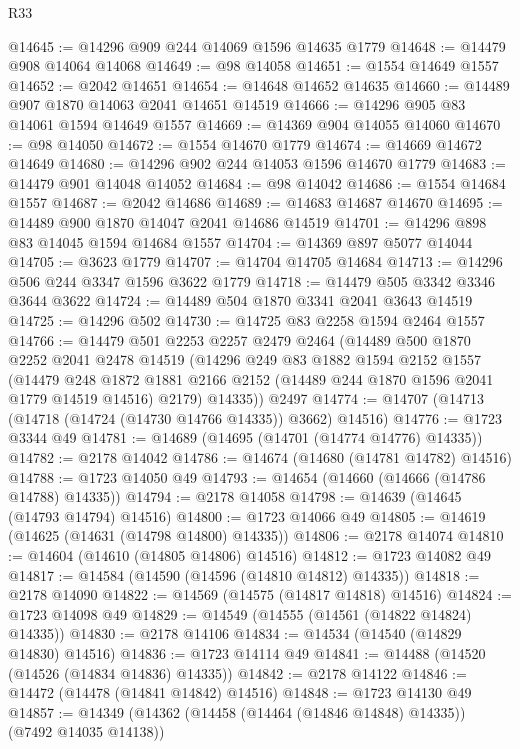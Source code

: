 \begin{lexlean}{R33}
\begin{coremodule}
@14645 := @14296 @909 @244 @14069 @1596 @14635 @1779
@14648 := @14479 @908 @14064 @14068
@14649 := @98 @14058
@14651 := @1554 @14649 @1557
@14652 := @2042 @14651
@14654 := @14648 @14652 @14635
@14660 := @14489 @907 @1870 @14063 @2041 @14651 @14519
@14666 := @14296 @905 @83 @14061 @1594 @14649 @1557
@14669 := @14369 @904 @14055 @14060
@14670 := @98 @14050
@14672 := @1554 @14670 @1779
@14674 := @14669 @14672 @14649
@14680 := @14296 @902 @244 @14053 @1596 @14670 @1779
@14683 := @14479 @901 @14048 @14052
@14684 := @98 @14042
@14686 := @1554 @14684 @1557
@14687 := @2042 @14686
@14689 := @14683 @14687 @14670
@14695 := @14489 @900 @1870 @14047 @2041 @14686 @14519
@14701 := @14296 @898 @83 @14045 @1594 @14684 @1557
@14704 := @14369 @897 @5077 @14044
@14705 := @3623 @1779
@14707 := @14704 @14705 @14684
@14713 := @14296 @506 @244 @3347 @1596 @3622 @1779
@14718 := @14479 @505 @3342 @3346 @3644 @3622
@14724 := @14489 @504 @1870 @3341 @2041 @3643 @14519
@14725 := @14296 @502
@14730 := @14725 @83 @2258 @1594 @2464 @1557
@14766 := @14479
    @501
    @2253
    @2257
    @2479
    @2464
    (@14489
      @500
      @1870
      @2252
      @2041
      @2478
      @14519
      (@14296
        @249
        @83
        @1882
        @1594
        @2152
        @1557
        (@14479
          @248
          @1872
          @1881
          @2166
          @2152
          (@14489 @244 @1870 @1596 @2041 @1779 @14519 @14516)
          @2179)
        @14335))
    @2497
@14774 := @14707 (@14713 (@14718 (@14724 (@14730 @14766 @14335)) @3662) @14516)
@14776 := @1723 @3344 @49
@14781 := @14689 (@14695 (@14701 (@14774 @14776) @14335))
@14782 := @2178 @14042
@14786 := @14674 (@14680 (@14781 @14782) @14516)
@14788 := @1723 @14050 @49
@14793 := @14654 (@14660 (@14666 (@14786 @14788) @14335))
@14794 := @2178 @14058
@14798 := @14639 (@14645 (@14793 @14794) @14516)
@14800 := @1723 @14066 @49
@14805 := @14619 (@14625 (@14631 (@14798 @14800) @14335))
@14806 := @2178 @14074
@14810 := @14604 (@14610 (@14805 @14806) @14516)
@14812 := @1723 @14082 @49
@14817 := @14584 (@14590 (@14596 (@14810 @14812) @14335))
@14818 := @2178 @14090
@14822 := @14569 (@14575 (@14817 @14818) @14516)
@14824 := @1723 @14098 @49
@14829 := @14549 (@14555 (@14561 (@14822 @14824) @14335))
@14830 := @2178 @14106
@14834 := @14534 (@14540 (@14829 @14830) @14516)
@14836 := @1723 @14114 @49
@14841 := @14488 (@14520 (@14526 (@14834 @14836) @14335))
@14842 := @2178 @14122
@14846 := @14472 (@14478 (@14841 @14842) @14516)
@14848 := @1723 @14130 @49
@14857 := @14349 (@14362 (@14458 (@14464 (@14846 @14848) @14335)) (@7492 @14035 @14138))

\end{coremodule}
\end{lexlean}
